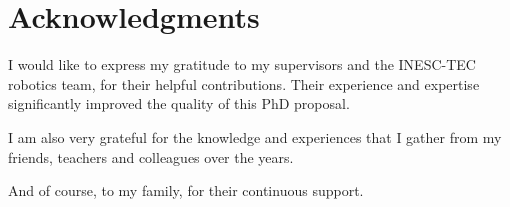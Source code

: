 \chapter*{Acknowledgments}

I would like to express my gratitude to my supervisors and the INESC-TEC robotics team, for their helpful contributions. Their experience and expertise significantly improved the quality of this PhD proposal.

I am also very grateful for the knowledge and experiences that I gather from my friends, teachers and colleagues over the years.

And of course, to my family, for their continuous support.

\vspace{10mm}
